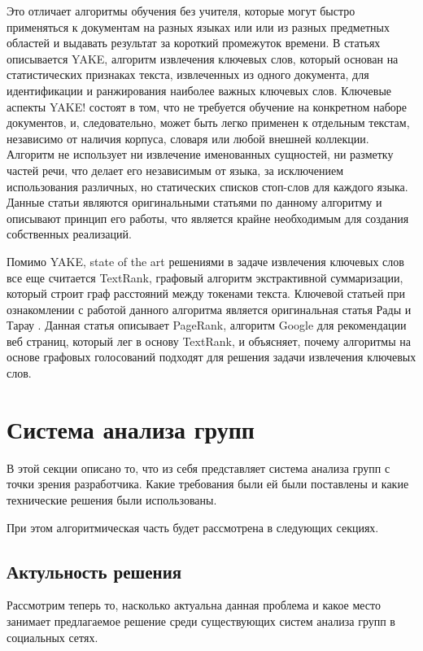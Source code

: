 \documentclass[14pt]{matmex-diploma-custom}
\begin{document}
Это отличает алгоритмы обучения без учителя, которые могут быстро применяться к документам на разных языках или или из разных предметных областей и выдавать результат за короткий промежуток времени. В статьях \cite{yake1, yake2} описывается YAKE, алгоритм извлечения ключевых слов, который основан на статистических признаках текста, извлеченных из одного документа, для идентификации и ранжирования наиболее важных ключевых слов. Ключевые аспекты YAKE! состоят в том, что не требуется обучение на конкретном наборе документов, и, следовательно, может быть легко применен к отдельным текстам, независимо от наличия корпуса, словаря или любой внешней коллекции. Алгоритм не использует ни извлечение именованных сущностей, ни разметку частей речи, что делает его независимым от языка, за исключением использования различных, но статических списков стоп-слов для каждого языка. Данные статьи являются оригинальными статьями по данному алгоритму и описывают принцип его работы, что является крайне необходимым для создания собственных реализаций.

Помимо YAKE, state of the art решениями в задаче извлечения ключевых слов все еще считается TextRank, графовый алгоритм экстрактивной суммаризации, который строит граф расстояний между токенами текста. Ключевой статьей при ознакомлении с работой данного алгоритма является оригинальная статья Рады и Тарау \cite{TextrankOriginal}. Данная статья описывает PageRank, алгоритм Google для рекомендации веб страниц, который лег в основу TextRank, и объясняет, почему алгоритмы на основе графовых голосований подходят для решения задачи извлечения ключевых слов.

\section{Система анализа групп}

В этой секции описано то, что из себя представляет система анализа групп с точки зрения разработчика.
Какие требования были ей были поставлены и какие технические решения были использованы.

При этом алгоритмическая часть будет рассмотрена в следующих секциях.

\subsection{Актульность решения}
Рассмотрим теперь то, насколько актуальна данная проблема 
и какое место занимает предлагаемое решение среди существующих систем анализа
групп в социальных сетях.
\end{document}
